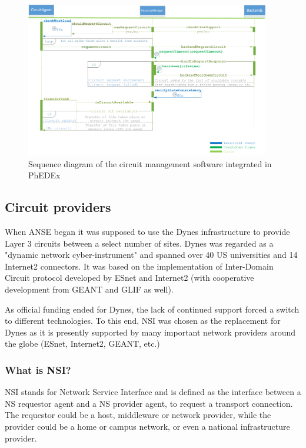 \begin{figure}[h]
  \centering
  \includegraphics[width=0.95\textwidth]{Figures/Circuit_framework-sequence_diagram.png}
  \caption{Sequence diagram of the circuit management software integrated in PhEDEx}
  \label{fig:sequence_diagram}
\end{figure} 

\subsection{Circuit providers}

When ANSE began it was supposed to use the Dynes infrastructure to provide Layer 3 circuits 
between a select number of sites. Dynes was regarded as a "dynamic network cyber-instrument"
and spanned over 40 US universities and 14 Internet2 connectors. It was based on the 
implementation of Inter-Domain Circuit protocol developed by ESnet and Internet2 (with 
cooperative development from GEANT and GLIF as well).

As official funding ended for Dynes, the lack of continued support forced a switch to different 
technologies. To this end, NSI was chosen as the replacement for Dynes as it is presently 
supported by many important network providers around the globe (ESnet, Internet2, GEANT, etc.)

\subsubsection{What is NSI?}

NSI stands for Network Service Interface and is defined as the interface between a
NS requestor agent and a NS provider agent, to request a transport connection.
The requestor could be a host, middleware or network provider, while the provider 
could be a home or campus network, or even a national infrastructure provider.

